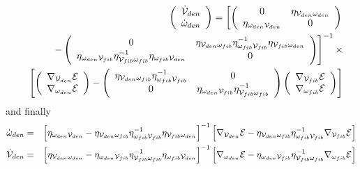 \begin{eqnarray}
&&\left( 
\begin{array}{c}
{\cal \dot{V}}_{den} \\ 
\dot{\omega}_{den}%
\end{array}%
\right) =\left[ \left( 
\begin{array}{cc}
0 & \eta _{{\cal V}_{den}\omega _{den}} \\ 
\eta _{\omega _{den}{\cal V}_{den}} & 0%
\end{array}%
\right) \right.  \nonumber \\
&&\left. -\left( 
\begin{array}{cc}
0 & \eta _{{\cal V}_{den}\omega _{fib}}\eta _{\omega _{fib}{\cal V}%
_{fib}}^{-1}\eta _{{\cal V}_{fib}\omega _{den}} \\ 
\eta _{\omega _{den}{\cal V}_{fib}}\eta _{{\cal V}_{fib}\omega
_{fib}}^{-1}\eta _{\omega _{fib}{\cal V}_{den}} & 0%
\end{array}%
\right) \right] ^{-1}\times  \nonumber \\
&&\left[ \left( 
\begin{array}{c}
\nabla _{{\cal V}_{den}}{\cal E} \\ 
\nabla _{\omega _{den}}{\cal E}%
\end{array}%
\right) -\left( 
\begin{array}{cc}
\eta _{{\cal V}_{den}\omega _{fib}}\eta _{\omega _{fib}{\cal V}_{fib}}^{-1}
& 0 \\ 
0 & \eta _{\omega _{den}{\cal V}_{fib}}\eta _{{\cal V}_{fib}\omega
_{fib}}^{-1}%
\end{array}%
\right) \left( 
\begin{array}{c}
\nabla _{{\cal V}_{fib}}{\cal E} \\ 
\nabla _{\omega _{fib}}{\cal E}%
\end{array}%
\right) \right]
\end{eqnarray}%
and finally 
\begin{eqnarray}
\dot{\omega}_{den} &=&\left[ \eta _{\omega _{den}{\cal V}_{den}}-\eta _{%
{\cal V}_{den}\omega _{fib}}\eta _{\omega _{fib}{\cal V}_{fib}}^{-1}\eta _{%
{\cal V}_{fib}\omega _{den}}\right] ^{-1}\left[ \nabla _{{\cal V}_{den}}%
{\cal E}-\eta _{{\cal V}_{den}\omega _{fib}}\eta _{\omega _{fib}{\cal V}%
_{fib}}^{-1}\nabla _{{\cal V}_{fib}}{\cal E}\right]  \label{OEOM} \\
{\cal \dot{V}}_{den} &=&\left[ \eta _{{\cal V}_{den}\omega _{den}}-\eta
_{\omega _{den}{\cal V}_{fib}}\eta _{{\cal V}_{fib}\omega _{fib}}^{-1}\eta
_{\omega _{fib}{\cal V}_{den}}\right] ^{-1}\left[ \nabla _{\omega _{den}}%
{\cal E}-\eta _{\omega _{den}{\cal V}_{fib}}\eta _{{\cal V}_{fib}\omega
_{fib}}^{-1}\nabla _{\omega _{fib}}{\cal E}\right]  \label{VEOM1}
\end{eqnarray}

